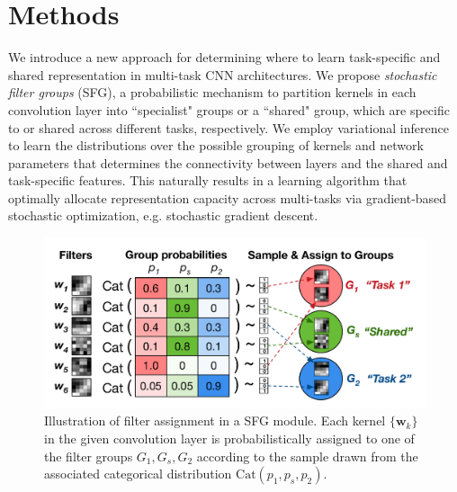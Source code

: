 
\section{Methods}
We introduce a new approach for determining where to learn task-specific and shared representation in multi-task CNN architectures. We propose \textit{stochastic filter groups} (SFG), a probabilistic mechanism to partition kernels in each convolution layer into ``specialist" groups or a ``shared" group, which are specific to or shared across different tasks, respectively. We employ variational inference to learn the distributions over the possible grouping of kernels and network parameters that determines the connectivity between layers and the shared and task-specific features. This naturally results in a learning algorithm that optimally allocate representation capacity across multi-tasks via gradient-based stochastic optimization, e.g. stochastic gradient descent. 


\begin{figure}[ht]
	\center
	\includegraphics[width=0.85\linewidth]{chapter_6/figures/sfg_figure_02.pdf}
	\caption{\small Illustration of filter assignment in a SFG module. Each kernel $\{\mathbf{w}_{k}\}$ in the given convolution layer is probabilistically assigned to one of the filter groups $G_1, G_{s}, G_{2}$ according to the sample drawn from the associated categorical distribution $\text{Cat}(p_1, p_{s}, p_2)$. }
    \label{fig:sfg}
\end{figure}

